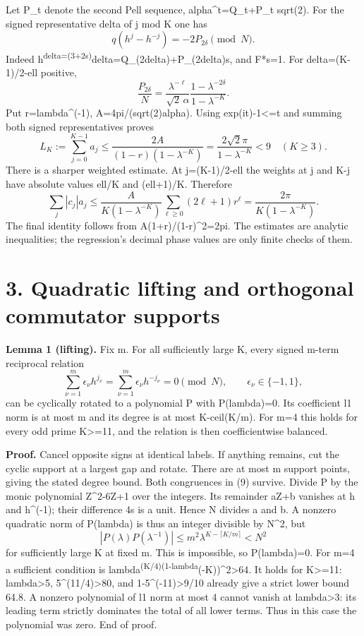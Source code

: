 \documentclass[11pt,a4paper]{article}
\begin{document}
Let P\_t denote the second Pell sequence, alpha\^{}t=Q\_t+P\_t sqrt(2). For the signed representative delta of j mod K one has \[
 q(h^j-h^{-j})=-2P_{2\delta}\pmod N.                            \tag{5}
\] Indeed h\textsuperscript{delta=(3+2s)}delta=Q\_(2delta)+P\_(2delta)s, and F*s=1. For delta=(K-1)/2-ell positive, \[
 \frac{P_{2\delta}}{N}
 =\frac{\lambda^{-\ell}}{\sqrt2\,\alpha}
       \frac{1-\lambda^{-2\delta}}{1-\lambda^{-K}}.              \tag{6}
\] Put r=lambda\^{}(-1), A=4pi/(sqrt(2)alpha). Using \textbar exp(it)-1\textbar\textless=\textbar t\textbar{} and summing both signed representatives proves \[
 L_K:=\sum_{j=0}^{K-1}a_j
 \leq\frac{2A}{(1-r)(1-\lambda^{-K})}
 =\frac{2\sqrt2\pi}{1-\lambda^{-K}}<9\quad(K\geq3).              \tag{7}
\] There is a sharper weighted estimate. At j=(K-1)/2-ell the weights at j and K-j have absolute values ell/K and (ell+1)/K. Therefore \[
 \sum_j |c_j|a_j
 \leq\frac{A}{K(1-\lambda^{-K})}\sum_{\ell\geq0}(2\ell+1)r^\ell
 =\frac{2\pi}{K(1-\lambda^{-K})}.                              \tag{8}
\] The final identity follows from A(1+r)/(1-r)\^{}2=2pi. The estimates are analytic inequalities; the regression's decimal phase values are only finite checks of them.

\hypertarget{quadratic-lifting-and-orthogonal-commutator-supports}{%
\section{3. Quadratic lifting and orthogonal commutator supports}\label{quadratic-lifting-and-orthogonal-commutator-supports}}

\textbf{Lemma 1 (lifting).} Fix m. For all sufficiently large K, every signed m-term reciprocal relation \[
 \sum_{\nu=1}^m\epsilon_\nu h^{j_\nu}
 =\sum_{\nu=1}^m\epsilon_\nu h^{-j_\nu}=0\pmod N,
 \qquad \epsilon_\nu\in\{-1,1\},                               \tag{9}
\] can be cyclically rotated to a polynomial P with P(lambda)=0. Its coefficient l1 norm is at most m and its degree is at most K-ceil(K/m). For m=4 this holds for every odd prime K\textgreater=11, and the relation is then coefficientwise balanced.

\textbf{Proof.} Cancel opposite signs at identical labels. If anything remains, cut the cyclic support at a largest gap and rotate. There are at most m support points, giving the stated degree bound. Both congruences in (9) survive. Divide P by the monic polynomial Z\^{}2-6Z+1 over the integers. Its remainder aZ+b vanishes at h and h\^{}(-1); their difference 4s is a unit. Hence N divides a and b. A nonzero quadratic norm of P(lambda) is thus an integer divisible by N\^{}2, but \[
 |P(\lambda)P(\lambda^{-1})|
 \leq m^2\lambda^{K-\lceil K/m\rceil}<N^2                       \tag{10}
\] for sufficiently large K at fixed m. This is impossible, so P(lambda)=0. For m=4 a sufficient condition is lambda\textsuperscript{(K/4)(1-lambda}(-K))\^{}2\textgreater64. It holds for K\textgreater=11: lambda\textgreater5, 5\^{}(11/4)\textgreater80, and 1-5\^{}(-11)\textgreater9/10 already give a strict lower bound 64.8. A nonzero polynomial of l1 norm at most 4 cannot vanish at lambda\textgreater3: its leading term strictly dominates the total of all lower terms. Thus in this case the polynomial was zero. End of proof.
\end{document}
